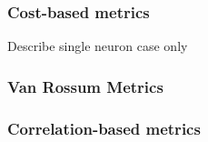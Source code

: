 \subsubsection{Cost-based metrics}
Describe single neuron case only

\subsubsection{Van Rossum Metrics}


\subsubsection{Correlation-based metrics}







\newpage























